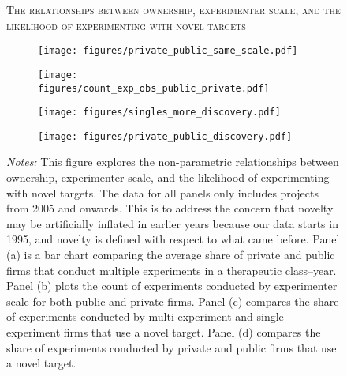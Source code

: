 \begin{figure}[h!]
\caption{\textsc{The relationships between ownership, experimenter scale, and the likelihood of experimenting with novel targets}}
\label{fig:firm-heterogeneity}
    \centering
    \begin{subfigure}[t]{.24\textwidth}
        \centering
        \caption{}
        \texttt{[image: figures/private\_public\_same\_scale.pdf]}
        \label{subfig:private_public_same_scale}
    \end{subfigure}
    \begin{subfigure}[t]{.24\textwidth}
        \centering
        \caption{}
        \texttt{[image: figures/count\_exp\_obs\_public\_private.pdf]}
        \label{subfig:count_exp_obs_public_private}
    \end{subfigure}
    \begin{subfigure}[t]{.24\textwidth}
        \centering
        \caption{}
        \texttt{[image: figures/singles\_more\_discovery.pdf]}
        \label{subfig:singles_more_discovery}
    \end{subfigure}
        \begin{subfigure}[t]{.24\textwidth}
        \centering
        \caption{}
        \texttt{[image: figures/private\_public\_discovery.pdf]}
        \label{subfig:private_public_discovery}
    \end{subfigure}
\caption*{\scriptsize\emph{Notes:} This figure explores the non-parametric relationships between ownership, experimenter scale, and the likelihood of experimenting with novel targets. The data for all panels only includes projects from 2005 and onwards. This is to address the concern that novelty may be artificially inflated in earlier years because our data starts in 1995, and novelty is defined with respect to what came before. Panel (a) is a bar chart comparing the average share of private and public firms that conduct multiple experiments in a therapeutic class--year. Panel (b) plots the count of experiments conducted by experimenter scale for both public and private firms. Panel (c) compares the share of experiments conducted by multi-experiment and single-experiment firms that use a novel target. Panel (d) compares the share of experiments conducted by private and public firms that use a novel target. 
}
\end{figure}

